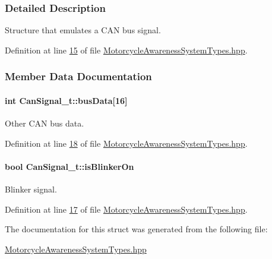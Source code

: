 \subsubsection{Detailed Description}
Structure that emulates a C\-A\-N bus signal. 

Definition at line \hyperlink{MotorcycleAwarenessSystemTypes_8hpp_source_l00015}{15} of file \hyperlink{MotorcycleAwarenessSystemTypes_8hpp_source}{Motorcycle\-Awareness\-System\-Types.\-hpp}.



\subsubsection{Member Data Documentation}
\hypertarget{structCanSignal__t_a460bece1b65aa03b07f986c71f818456}{
\paragraph[{bus\-Data}]{\setlength{\rightskip}{0pt plus 5cm}int Can\-Signal\-\_\-t\-::bus\-Data\mbox{[}16\mbox{]}}}\label{structCanSignal__t_a460bece1b65aa03b07f986c71f818456}


Other C\-A\-N bus data. 



Definition at line \hyperlink{MotorcycleAwarenessSystemTypes_8hpp_source_l00018}{18} of file \hyperlink{MotorcycleAwarenessSystemTypes_8hpp_source}{Motorcycle\-Awareness\-System\-Types.\-hpp}.

\hypertarget{structCanSignal__t_a209edc6387534529f57c2362ec8f2586}{
\paragraph[{is\-Blinker\-On}]{\setlength{\rightskip}{0pt plus 5cm}bool Can\-Signal\-\_\-t\-::is\-Blinker\-On}}\label{structCanSignal__t_a209edc6387534529f57c2362ec8f2586}


Blinker signal. 



Definition at line \hyperlink{MotorcycleAwarenessSystemTypes_8hpp_source_l00017}{17} of file \hyperlink{MotorcycleAwarenessSystemTypes_8hpp_source}{Motorcycle\-Awareness\-System\-Types.\-hpp}.



The documentation for this struct was generated from the following file\-:\begin{DoxyCompactItemize}
\item 
\hyperlink{MotorcycleAwarenessSystemTypes_8hpp}{Motorcycle\-Awareness\-System\-Types.\-hpp}\end{DoxyCompactItemize}
